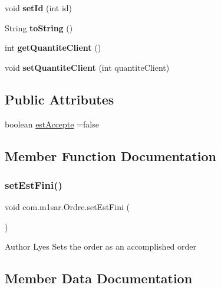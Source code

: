 \begin{DoxyCompactItemize}
void {\bfseries set\+Id} (int id)
\item 
\mbox{\label{classcom_1_1m1sar_1_1_ordre_a206ed238c2faba3586f21832cbf28d59}} 
String {\bfseries to\+String} ()
\item 
\mbox{\label{classcom_1_1m1sar_1_1_ordre_a89c5590f532e59c0af9e23c834c0aa8e}} 
int {\bfseries get\+Quantite\+Client} ()
\item 
\mbox{\label{classcom_1_1m1sar_1_1_ordre_a56112d1939a3bbdf6c789349083342f9}} 
void {\bfseries set\+Quantite\+Client} (int quantite\+Client)
\end{DoxyCompactItemize}
\subsection*{Public Attributes}
\begin{DoxyCompactItemize}
\item 
boolean \hyperlink{classcom_1_1m1sar_1_1_ordre_a7022809430ff96ce182601f7885d853c}{est\+Accepte} =false
\end{DoxyCompactItemize}


\subsection{Member Function Documentation}
\mbox{\label{classcom_1_1m1sar_1_1_ordre_aabc1a386ae20e7aa15391de8c2ab0062}} 
\subsubsection{\texorpdfstring{set\+Est\+Fini()}{setEstFini()}}
{\footnotesize\ttfamily void com.\+m1sar.\+Ordre.\+set\+Est\+Fini (\begin{DoxyParamCaption}{ }\end{DoxyParamCaption})}

\begin{DoxyAuthor}{Author}
Lyes Sets the order as an accomplished order 
\end{DoxyAuthor}


\subsection{Member Data Documentation}
\mbox{\label{classcom_1_1m1sar_1_1_ordre_a7022809430ff96ce182601f7885d853c}} 
